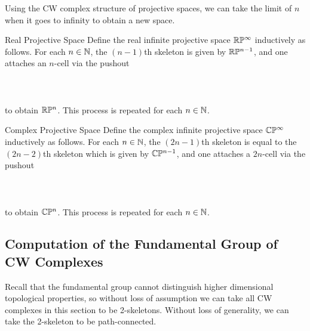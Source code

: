 \documentclass[a4paper]{article}
\begin{document}
Using the CW complex structure of projective spaces, we can take the limit of $n$ when it goes to infinity to obtain a new space. 

\begin{defn}{Real Projective Space}{} Define the real infinite projective space $\mathbb{R}\mathbb{P}^\infty$ inductively as follows. For each $n\in\mathbb{N}$, the $(n-1)$th skeleton is given by $\mathbb{R}\mathbb{P}^{n-1}$, and one attaches an $n$-cell via the pushout \\~\\
\\~\\
to obtain $\mathbb{R}\mathbb{P}^n$. This process is repeated for each $n\in\mathbb{N}$. 
\end{defn}

\begin{defn}{Complex Projective Space}{} Define the complex infinite projective space $\mathbb{C}\mathbb{P}^\infty$ inductively as follows. For each $n\in\mathbb{N}$, the $(2n-1)$th skeleton is equal to the $(2n-2)$th skeleton which is given by $\mathbb{C}\mathbb{P}^{n-1}$, and one attaches a $2n$-cell via the pushout \\~\\
\\~\\
to obtain $\mathbb{C}\mathbb{P}^n$. This process is repeated for each $n\in\mathbb{N}$. 
\end{defn}

\subsection{Computation of the Fundamental Group of CW Complexes}
Recall that the fundamental group cannot distinguish higher dimensional topological properties, so without loss of assumption we can take all CW complexes in this section to be 2-skeletons. Without loss of generality, we can take the 2-skeleton to be path-connected. \\~\\
\end{document}
